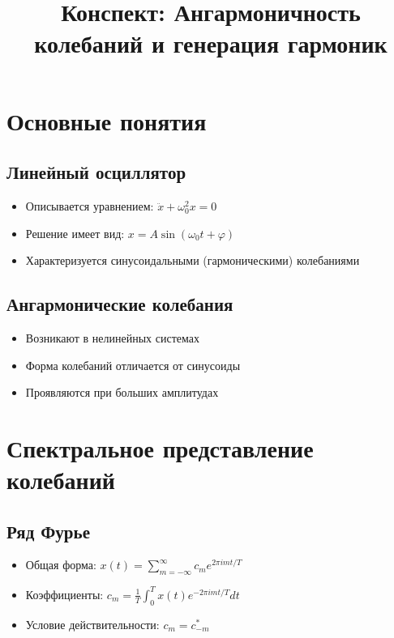\documentclass[12pt]{article}
\begin{document}
\title{Конспект: Ангармоничность колебаний и генерация гармоник}
\author{}
\date{}
\maketitle

\section{Основные понятия}

\subsection{Линейный осциллятор}
\begin{itemize}
    \item Описывается уравнением: $\ddot{x} + \omega_0^2 x = 0$
    \item Решение имеет вид: $x=A \sin(\omega_0 t+\varphi)$
    \item Характеризуется синусоидальными (гармоническими) колебаниями
\end{itemize}

\subsection{Ангармонические колебания}
\begin{itemize}
    \item Возникают в нелинейных системах
    \item Форма колебаний отличается от синусоиды
    \item Проявляются при больших амплитудах
\end{itemize}

\section{Спектральное представление колебаний}

\subsection{Ряд Фурье}
\begin{itemize}
    \item Общая форма: $x(t)=\sum_{m=-\infty}^{\infty} c_{m} e^{2\pi imt/T}$
    \item Коэффициенты: $c_{m}=\frac{1}{T}\int_{0}^{T} x(t)e^{-2\pi imt/T}dt$
    \item Условие действительности: $c_m = c_{-m}^*$
\end{itemize}
\end{document}
